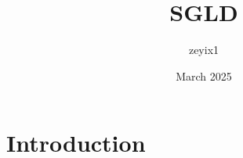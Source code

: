 \documentclass{article}
\title{SGLD}
\author{zeyix1 }
\date{March 2025}
\begin{document}
\maketitle

\section{Introduction}
\end{document}
